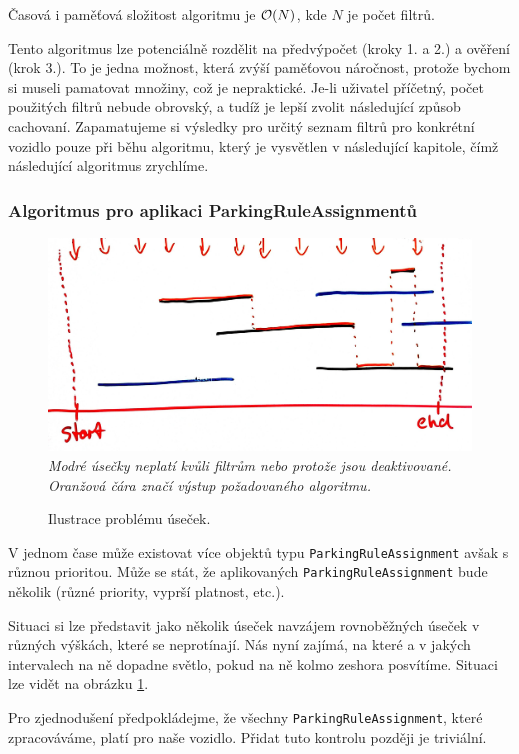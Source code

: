 Časová i paměťová složitost algoritmu je ${\cal O}(N)$, kde $N$ je počet filtrů.

Tento algoritmus lze potenciálně rozdělit na předvýpočet (kroky 1. a 2.) a ověření (krok 3.).
To je jedna možnost, která zvýší paměťovou náročnost, protože bychom si museli pamatovat množiny, což je nepraktické.
Je-li uživatel příčetný, počet použitých filtrů nebude obrovský, a tudíž je lepší zvolit následující způsob cachovaní.
Zapamatujeme si výsledky pro určitý seznam filtrů pro konkrétní vozidlo pouze při běhu algoritmu, který je
vysvětlen v následující kapitole, čímž následující algoritmus zrychlíme.

\subsubsection*{Algoritmus pro aplikaci ParkingRuleAssignmentů}

\begin{figure}[!htb] \centering
  \includegraphics[width=145mm]{../img/rules_drawing.jpg}
  \textit{Modré úsečky neplatí kvůli filtrům nebo protože jsou deaktivované. Oranžová čára značí výstup požadovaného algoritmu.}
  \caption{Ilustrace problému úseček.}
  \label{fig:rules_drawing}
\end{figure}

V jednom čase může existovat více objektů typu \texttt{ParkingRuleAssignment} avšak s různou prioritou.
Může se stát, že aplikovaných \texttt{ParkingRuleAssignment} bude několik (různé priority, vyprší platnost, etc.).

Situaci si lze představit jako několik úseček navzájem rovnoběžných úseček v různých výškách, které se neprotínají.
Nás nyní zajímá, na které a v jakých intervalech na ně dopadne světlo, pokud na ně kolmo zeshora posvítíme.
Situaci lze vidět na obrázku \ref{fig:rules_drawing}.

Pro zjednodušení předpokládejme, že všechny \texttt{ParkingRuleAssignment}, které zpracováváme, platí pro naše vozidlo.
Přidat tuto kontrolu později je triviální.

